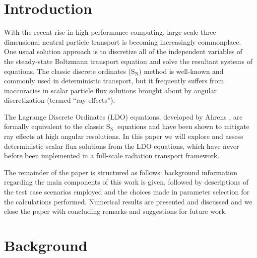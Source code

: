 \documentclass{article} %
\newcommand{\sn}{S$_\mathrm{N}$}
\begin{document}
\begin{abstract}
{
abstract

Keywords: x; y; z
}
\end{abstract}

\pagebreak

\section{Introduction}
\label{sec:intro}

With the recent rise in high-performance computing, large-scale 
three-dimensional neutral particle transport is becoming increasingly
commonplace. One usual solution approach is to discretize all of the
independent variables of the steady-state Boltzmann transport equation and
solve the resultant systems of equations. The classic discrete ordinates (\sn)
method is well-known and commonly used in deterministic transport, but it
frequently suffers from inaccuracies in scalar particle flux solutions
brought about by angular discretization (termed ``ray effects'').

The Lagrange Discrete Ordinates (LDO) equations, developed by Ahrens
\cite{ahrens}, are formally equivalent to the classic \sn\ equations and have
been shown to mitigate ray effects at high angular resolutions.
In this paper we will explore and assess deterministic scalar flux solutions
from the LDO equations, which have never before
been implemented in a full-scale radiation transport framework.


The remainder of the paper is structured as follows: background information
regarding the main components of this work is given, followed by descriptions
of the test case scenarios employed and the choices made in parameter selection
for the calculations performed. Numerical results are presented and discussed
and we close the paper with concluding remarks and suggestions for future work.

\section{Background}
\label{sec:background}
\end{document}
